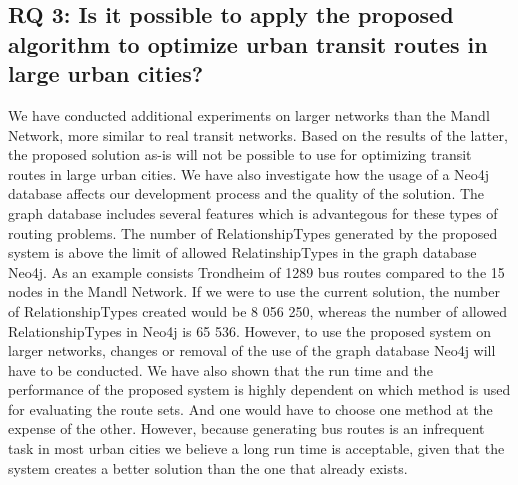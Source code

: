 \subsection*{RQ 3: Is it possible to apply the proposed algorithm to optimize urban transit routes in large urban cities?}

We have conducted additional experiments on larger networks than the Mandl Network, more similar to real transit networks. Based on the results of the latter, the proposed solution as-is will not be possible to use for optimizing transit routes in large urban cities. We have also investigate how the usage of a Neo4j database affects our development process and the quality of the solution. The graph database includes several features which is advantegous for these types of routing problems.  The number of RelationshipTypes generated by the proposed system is above the limit of allowed RelatinshipTypes in the graph database Neo4j. As an example consists Trondheim of 1289 bus routes compared to the 15 nodes in the Mandl Network. If we were to use the current solution, the number of RelationshipTypes created would be 8 056 250, whereas the number of allowed RelationshipTypes in Neo4j is 65 536. However, to use the proposed system on larger networks, changes or removal of the use of the graph database Neo4j will have to be conducted. We have also shown that the run time and the performance of the proposed system is highly dependent on which method is used for evaluating the route sets. And one would have to choose one method at the expense of the other. However, because generating bus routes is an infrequent task in most urban cities we believe a long run time is acceptable, given that the system creates a better solution than the one that already exists. 